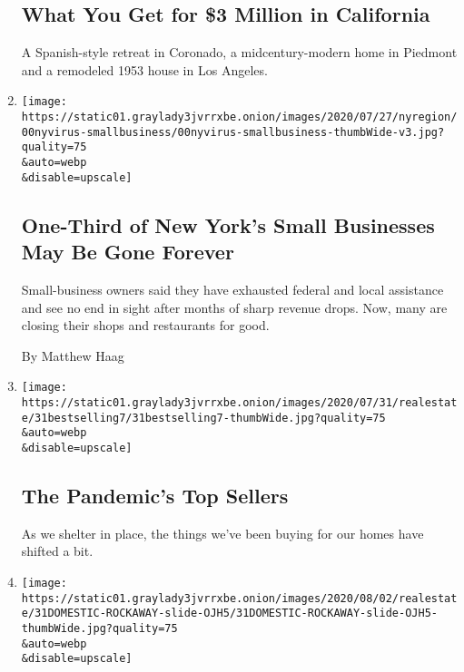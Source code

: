 \begin{enumerate}
  \hypertarget{what-you-get-for-3-million-in-california}{%
  \subsection{What You Get for \$3 Million in
  California}\label{what-you-get-for-3-million-in-california}}

  A Spanish-style retreat in Coronado, a midcentury-modern home in
  Piedmont and a remodeled 1953 house in Los Angeles.
\item
  \href{/2020/08/03/nyregion/nyc-small-businesses-closing-coronavirus.html}{}

  \texttt{[image: https://static01.graylady3jvrrxbe.onion/images/2020/07/27/nyregion/00nyvirus-smallbusiness/00nyvirus-smallbusiness-thumbWide-v3.jpg?quality=75\\\&auto=webp\\\&disable=upscale]}

  \hypertarget{one-third-of-new-yorks-small-businesses-may-be-gone-forever}{%
  \subsection{One-Third of New York's Small Businesses May Be Gone
  Forever}\label{one-third-of-new-yorks-small-businesses-may-be-gone-forever}}

  Small-business owners said they have exhausted federal and local
  assistance and see no end in sight after months of sharp revenue
  drops. Now, many are closing their shops and restaurants for good.

  By Matthew Haag
\item
  \href{/slideshow/2020/07/31/realestate/the-pandemics-top-sellers.html}{}

  \texttt{[image: https://static01.graylady3jvrrxbe.onion/images/2020/07/31/realestate/31bestselling7/31bestselling7-thumbWide.jpg?quality=75\\\&auto=webp\\\&disable=upscale]}

  \hypertarget{the-pandemics-top-sellers}{%
  \subsection{The Pandemic's Top
  Sellers}\label{the-pandemics-top-sellers}}

  As we shelter in place, the things we've been buying for our homes
  have shifted a bit.
\item
  \href{/slideshow/2020/07/31/realestate/an-urban-beach-life.html}{}

  \texttt{[image: https://static01.graylady3jvrrxbe.onion/images/2020/08/02/realestate/31DOMESTIC-ROCKAWAY-slide-OJH5/31DOMESTIC-ROCKAWAY-slide-OJH5-thumbWide.jpg?quality=75\\\&auto=webp\\\&disable=upscale]}


\end{enumerate}
